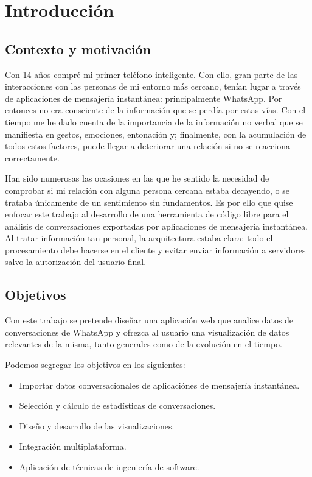 \chapter{Introducción}
\label{chap:introduction}

\section{Contexto y motivación}
\label{sec:context}

Con 14 años compré mi primer teléfono inteligente. Con ello, gran parte de las interacciones con las personas de mi entorno más cercano, tenían lugar a través de aplicaciones de mensajería instantánea: principalmente WhatsApp. Por entonces no era consciente de la información que se perdía por estas vías. Con el tiempo me he dado cuenta de la importancia de la información no verbal que se manifiesta en gestos, emociones, entonación y; finalmente, con la acumulación de todos estos factores, puede llegar a deteriorar una relación si no se reacciona correctamente.

Han sido numerosas las ocasiones en las que he sentido la necesidad de comprobar si mi relación con alguna persona cercana estaba decayendo, o se trataba únicamente de un sentimiento sin fundamentos. Es por ello que quise enfocar este trabajo al desarrollo de una herramienta de código libre para el análisis de conversaciones exportadas por aplicaciones de mensajería instantánea. Al tratar información tan personal, la arquitectura estaba clara: todo el procesamiento debe hacerse en el cliente y evitar enviar información a servidores salvo la autorización del usuario final.

\section{Objetivos}
\label{sec:project-goals}


Con este trabajo se pretende diseñar una aplicación web que analice datos de conversaciones de WhatsApp y ofrezca al usuario una visualización de datos relevantes de la misma, tanto generales como de la evolución en el tiempo.

Podemos segregar los objetivos en los siguientes:

\begin{itemize}

\item Importar datos conversacionales de aplicaciónes de mensajería instantánea.
\item Selección y cálculo de estadísticas de conversaciones.
\item Diseño y desarrollo de las visualizaciones.
\item Integración multiplataforma.
\item Aplicación de técnicas de ingeniería de software.

\end{itemize}

